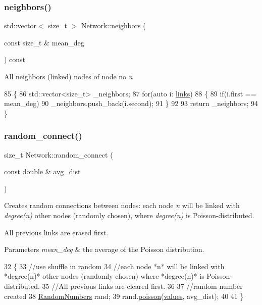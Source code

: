 \subsubsection{\texorpdfstring{neighbors()}{neighbors()}}
{\footnotesize\ttfamily std\+::vector$<$ size\+\_\+t $>$ Network\+::neighbors (\begin{DoxyParamCaption}\item[{const size\+\_\+t \&}]{mean\+\_\+deg }\end{DoxyParamCaption}) const}

All neighbors (linked) nodes of node no {\itshape n} 
\begin{DoxyCode}
85 \{
86     std::vector<size\_t> \_neighbors;
87     \textcolor{keywordflow}{for}(\textcolor{keyword}{auto} i: \mbox{\hyperlink{classNetwork_a1b5fbd7815319e330841dbd961d9f8cc}{links}})
88     \{
89         \textcolor{keywordflow}{if}(i.first == mean\_deg)
90             \_neighbors.push\_back(i.second);
91     \}
92     
93     \textcolor{keywordflow}{return} \_neighbors;
94 \}
\end{DoxyCode}
\mbox{\label{classNetwork_aab69fcd3971532b165c4a4ff7df4b81c}} 
\subsubsection{\texorpdfstring{random\+\_\+connect()}{random\_connect()}}
{\footnotesize\ttfamily size\+\_\+t Network\+::random\+\_\+connect (\begin{DoxyParamCaption}\item[{const double \&}]{avg\+\_\+dist }\end{DoxyParamCaption})}

Creates random connections between nodes\+: each node {\itshape n} will be linked with {\itshape degree(n)} other nodes (randomly chosen), where {\itshape degree(n)} is Poisson-\/distributed.

All previous links are erased first. 
\begin{DoxyParams}{Parameters}
{\em mean\+\_\+deg} & the average of the Poisson distribution. \\
\hline
\end{DoxyParams}

\begin{DoxyCode}
32 \{
33     \textcolor{comment}{//use shuffle in random}
34     \textcolor{comment}{//each node *n* will be linked with *degree(n)* other nodes (randomly chosen) where *degree(n)* is
       Poisson-distributed.}
35     \textcolor{comment}{//All previous links are cleared first.}
36     
37     \textcolor{comment}{//random number created }
38     \mbox{\hyperlink{classRandomNumbers}{RandomNumbers}} rand;
39     rand.\mbox{\hyperlink{classRandomNumbers_a69e33058b8a923f9597cf13421d5fcd4}{poisson}}(\mbox{\hyperlink{classNetwork_ab4062dd3b2fc7825f21a686d76e3c696}{values}}, avg\_dist);
40     
41 \}
\end{DoxyCode}
\mbox{\label{classNetwork_acbc93883d63221b1204055d7192c74e3}} 
